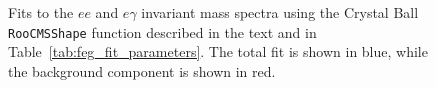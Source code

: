 \documentclass[dissertation.tex]{subfiles}
\begin{document}
\begin{figure}
	\centering
	\hspace{1cm}
	\caption{Fits to the $ee$ and $e\gamma$ invariant mass spectra using the Crystal Ball \texttt{RooCMSShape} function described in the text and in Table~\ref{tab:feg_fit_parameters}.  The total fit is shown in blue, while the background component is shown in red.}
	\label{fig:feg_fits}
\end{figure}
\end{document}
